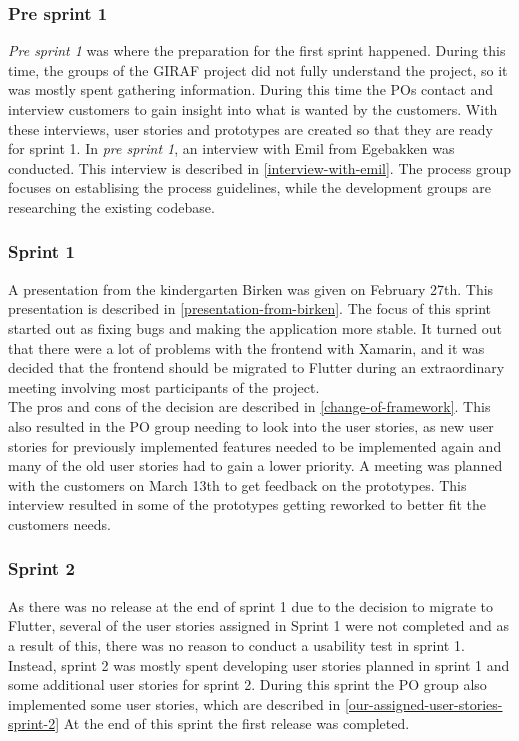 \subsubsection{Pre sprint 1}
\textit{Pre sprint 1} was where the preparation for the first sprint happened.
During this time, the groups of the GIRAF project did not fully understand the project, so it was mostly spent gathering information.
During this time the POs contact and interview customers to gain insight into what is wanted by the customers.
With these interviews, user stories and prototypes are created so that they are ready for sprint 1.
In \textit{pre sprint 1}, an interview with Emil from Egebakken was conducted. 
This interview is described in \autoref{interview-with-emil}.
The process group focuses on establising the process guidelines, while the development groups are researching the existing codebase.

\subsubsection{Sprint 1}
A presentation from the kindergarten Birken was given on February 27th.
This presentation is described in \autoref{presentation-from-birken}.
The focus of this sprint started out as fixing bugs and making the application more stable.
It turned out that there were a lot of problems with the frontend with Xamarin, and it was decided that the frontend should be migrated to Flutter during an extraordinary meeting involving most participants of the project. \\
The pros and cons of the decision are described in \autoref{change-of-framework}.
This also resulted in the PO group needing to look into the user stories, as new user stories for previously implemented features needed to be implemented again and many of the old user stories had to gain a lower priority.
A meeting was planned with the customers on March 13th to get feedback on the prototypes. 
This interview resulted in some of the prototypes getting reworked to better fit the customers needs.

\subsubsection{Sprint 2}
As there was no release at the end of sprint 1 due to the decision to migrate to Flutter, several of the user stories assigned in Sprint 1 were not completed and as a result of this, there was no reason to conduct a usability test in sprint 1.
Instead, sprint 2 was mostly spent developing user stories planned in sprint 1 and some additional user stories for sprint 2.
During this sprint the PO group also implemented some user stories, which are described in \autoref{our-assigned-user-stories-sprint-2}
At the end of this sprint the first release was completed.

